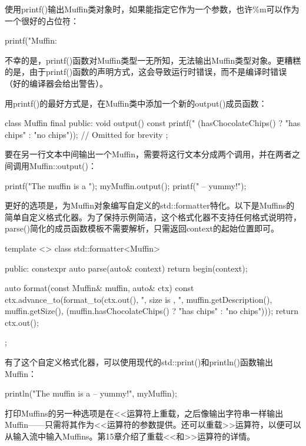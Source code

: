使用printf()输出Muffin类对象时，如果能指定它作为一个参数，也许\%m可以作为一个很好的占位符：

\begin{cpp}
printf("Muffin: %
\end{cpp}

不幸的是，printf()函数对Muffin类型一无所知，无法输出Muffin类型对象。更糟糕的是，由于printf()函数的声明方式，这会导致运行时错误，而不是编译时错误（好的编译器会给出警告）。

用printf()的最好方式是，在Muffin类中添加一个新的output()成员函数：

\begin{cpp}
class Muffin final
{
    public:
    void output() const
    {
        printf("%
            (hasChocolateChips() ? "has chips" : "no chips"));
    }
    // Omitted for brevity
};
\end{cpp}

要在另一行文本中间输出一个Muffin，需要将这行文本分成两个调用，并在两者之间调用Muffin::output()：

\begin{cpp}
printf("The muffin is a ");
myMuffin.output();
printf(" -- yummy!\n");
\end{cpp}

更好的选项是，为Muffin对象编写自定义的std::formatter特化。以下是Muffins的简单自定义格式化器。为了保持示例简洁，这个格式化器不支持任何格式说明符，parse()简化的成员函数模板不需要解析，只需返回context的起始位置即可。

\begin{cpp}
template <>
class std::formatter<Muffin>
{
    public:
    constexpr auto parse(auto& context) { return begin(context); }

    auto format(const Muffin& muffin, auto& ctx) const
    {
        ctx.advance_to(format_to(ctx.out(), "{}, size is {}, {}",
            muffin.getDescription(), muffin.getSize(),
            (muffin.hasChocolateChips() ? "has chips" : "no chips")));
        return ctx.out();
    }
};
\end{cpp}

有了这个自定义格式化器，可以使用现代的std::print()和println()函数输出Muffin：

\begin{cpp}
println("The muffin is a {} -- yummy!", myMuffin);
\end{cpp}

打印Muffins的另一种选项是在<{}<运算符上重载，之后像输出字符串一样输出Muffin——只需将其作为<{}<运算符的参数提供。还可以重载>{}>运算符，以便可以从输入流中输入Muffins。第15章介绍了重载<{}<和>{}>运算符的详情。

